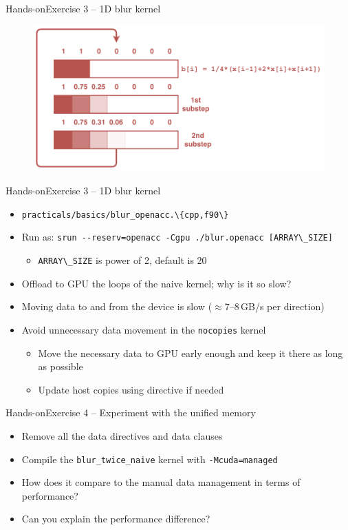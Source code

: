 \documentclass[12pt,aspectratio=169]{beamer}
\newcommand\shinline[2][]{\lstinline[style=shstyle,basicstyle=\ttfamily,#1]!#2!}
\begin{document}
\begin{frame}{Hands-on}{Exercise 3 -- 1D blur kernel}
  \begin{figure}
    \centering
    \includegraphics[width=.7\textwidth]{blur_twice_kernel}
  \end{figure}
\end{frame}


\begin{frame}{Hands-on}{Exercise 3 -- 1D blur kernel}
  \begin{itemize}
  \item \shinline{practicals/basics/blur_openacc.\{cpp,f90\}}
  \item Run as: \shinline{srun --reserv=openacc -Cgpu ./blur.openacc [ARRAY\_SIZE]}
    \begin{itemize}
    \item \shinline{ARRAY\_SIZE} is power of 2, default is 20
    \end{itemize}
  \item Offload to GPU the loops of the naive kernel; why is it so slow?
    \pause
    \vfill
  \item Moving data to and from the device is slow ($\approx$7--8\,GB/s per direction)
  \item Avoid unnecessary data movement in the \texttt{nocopies} kernel
    \begin{itemize}
    \item Move the necessary data to GPU early enough and keep it there as long as possible
    \item Update host copies using  directive if needed
    \end{itemize}
  \end{itemize}
\end{frame}


\begin{frame}{Hands-on}{Exercise 4 -- Experiment with the unified memory}
  \begin{itemize}
  \item Remove all the data directives and data clauses
  \item Compile the \texttt{blur\_twice\_naive} kernel with \texttt{-Mcuda=managed}
  \item How does it compare to the manual data management in terms of performance?
  \item Can you explain the performance difference?
  \end{itemize}
\end{frame}
\end{document}
